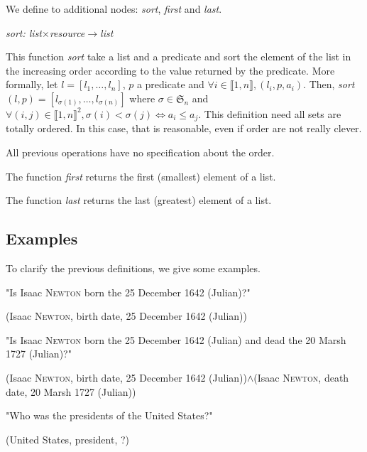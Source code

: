 We define to additional nodes: \textsl{sort}, \textsl{first} and \textsl{last}.

\begin{center}
\textsl{sort: list$\times$resource$\rightarrow$list}
\end{center}
This function \textsl{sort} take a list and a predicate and sort the element of the list in the increasing order according to the value returned by the predicate. More formally, let $l=[l_1,\ldots,l_n]$, $p$ a predicate and $\forall i\in\llbracket1,n\rrbracket, (l_i,p,a_i)$. Then, \textsl{sort}$(l,p) = [l_{\sigma(1)},\ldots,l_{\sigma(n)}]$ where $\sigma\in\mathfrak{S}_n$ and $\forall (i,j)\in\llbracket 1,n\rrbracket^2, \sigma(i)<\sigma(j) \Leftrightarrow a_i \leqslant a_j$. This definition need all sets are totally ordered. In this case, that is reasonable, even if order are not really clever.

All previous operations have no specification about the order.

The function \textsl{first} returns the first (smallest) element of a list.

The function \textsl{last} returns the last (greatest) element of a list.

\subsection{Examples}

To clarify the previous definitions, we give some examples.

\bigskip

"Is Isaac \textsc{Newton} born the 25 December 1642 (Julian)?"
\begin{center}(Isaac \textsc{Newton}, birth date, 25 December 1642 (Julian))\end{center}

\bigskip

"Is Isaac \textsc{Newton} born the 25 December 1642 (Julian) and dead the 20 Marsh 1727 (Julian)?"
\begin{center}(Isaac \textsc{Newton}, birth date, 25 December 1642 (Julian))$\wedge$(Isaac \textsc{Newton}, death date, 20 Marsh 1727 (Julian))\end{center}

\bigskip

"Who was the presidents of the United States?"
\begin{center}(United States, president, ?)\end{center}

